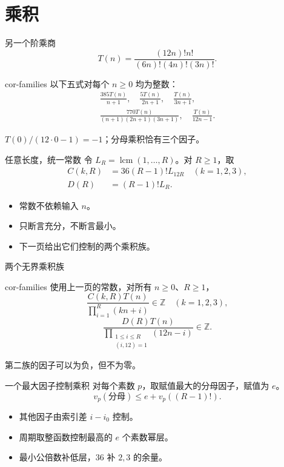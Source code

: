 \documentclass{beamer}
\begin{document}
\section{乘积}
\begin{frame}{另一个阶乘商}
\[
T(n)=\frac{(12n)!n!}{(6n)!(4n)!(3n)!}.
\]
\begin{bookresult}{cor-families}
以下五式对每个 $n\geq0$ 均为整数：
\[
\begin{gathered}
\frac{385T(n)}{n+1},\quad\frac{5T(n)}{2n+1},\quad\frac{T(n)}{3n+1},\\
\frac{770T(n)}{(n+1)(2n+1)(3n+1)},\quad\frac{T(n)}{12n-1}.
\end{gathered}
\]
\end{bookresult}
$T(0)/(12\cdot0-1)=-1$；分母乘积恰有三个因子。
\end{frame}
\begin{frame}{任意长度，统一常数}
令 $L_R=\operatorname{lcm}(1,\ldots,R)$。对 $R\geq1$，取
\[
\begin{aligned}
C(k,R)&=36(R-1)!L_{12R}\quad(k=1,2,3),\\
D(R)&=(R-1)!L_R.
\end{aligned}
\]
\begin{itemize}
\item 常数不依赖输入 $n$。
\item 只断言充分，不断言最小。
\item 下一页给出它们控制的两个乘积族。
\end{itemize}
\end{frame}
\begin{frame}{两个无界乘积族}
\begin{bookresult}{cor-families}
使用上一页的常数，对所有 $n\geq0$、$R\geq1$，
\[
\frac{C(k,R)T(n)}{\prod_{i=1}^R(kn+i)}\in\mathbb Z\quad(k=1,2,3),
\]
\[
\frac{D(R)T(n)}{\prod_{\substack{1\leq i\leq R\\(i,12)=1}}(12n-i)}\in\mathbb Z.
\]
\end{bookresult}
第二族的因子可以为负，但不为零。
\end{frame}
\begin{frame}{一个最大因子控制乘积}
对每个素数 $p$，取赋值最大的分母因子，赋值为 $e$。
\[
v_p(\text{分母})\leq e+v_p((R-1)!).
\]
\begin{itemize}
\item 其他因子由索引差 $i-i_0$ 控制。
\item 周期取整函数控制最高的 $e$ 个素数幂层。
\item 最小公倍数补低层，$36$ 补 $2,3$ 的余量。
\end{itemize}
\end{frame}
\end{document}
